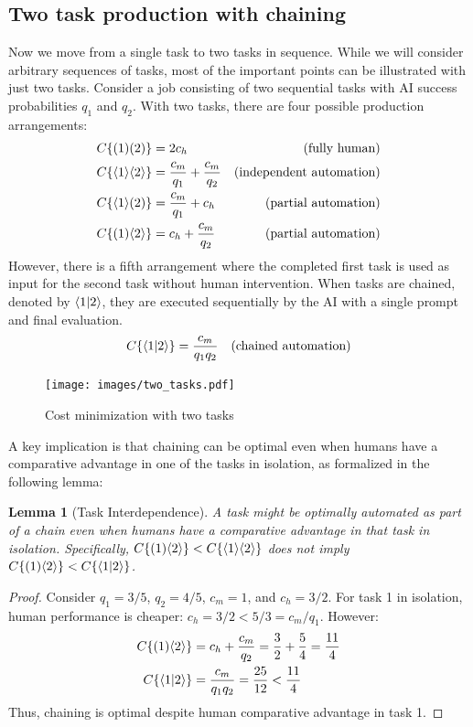 \documentclass{article}
\newtheorem{lemma}[theorem]{Lemma}
\begin{document}
\subsection{Two task production with chaining}
Now we move from a single task to two tasks in sequence. 
While we will consider arbitrary sequences of tasks, most of the important points can be illustrated with just two tasks.
Consider a job consisting of two sequential tasks with AI success probabilities $q_1$ and $q_2$.
With two tasks, there are four possible production arrangements:
\begin{align*}
    C\{ ( 1 )( 2 ) \} &= 2c_h & \text{(fully human)} \\
    C\{ \langle 1 \rangle\langle 2 \rangle \} &= \frac{c_m}{q_1} + \frac{c_m}{q_2} & \text{(independent automation)} \\
    C\{ \langle 1 \rangle( 2 ) \} &= \frac{c_m}{q_1} + c_h & \text{(partial automation)} \\
    C\{ ( 1 )\langle 2 \rangle \} &= c_h + \frac{c_m}{q_2} & \text{(partial automation)} \\
\end{align*}
However, there is a fifth arrangement where the completed first task is used as input for the second task without human intervention.
When tasks are chained, denoted by $\langle 1|2 \rangle$, they are executed sequentially by the AI with a single prompt and final evaluation.
\begin{align}
C\{ \langle 1|2 \rangle \} &= \frac{c_m}{q_1q_2} & \text{(chained automation)}
\end{align}

\begin{figure}
  \caption{Cost minimization with two tasks} \label{fig:two_tasks}
  \texttt{[image: images/two\_tasks.pdf]}
\end{figure}

A key implication is that chaining can be optimal even when humans have a comparative advantage in one of the tasks in isolation, as formalized in the following lemma:

\begin{lemma}[Task Interdependence] \label{lemma:interdependence}
A task might be optimally automated as part of a chain even when humans have a comparative advantage in that task in isolation.
Specifically, $C\{ ( 1 )\langle 2 \rangle \} < C\{ \langle 1 \rangle\langle 2 \rangle \}$ does not imply $C\{ ( 1 )\langle 2 \rangle \} < C\{ \langle 1|2 \rangle \}$.
\end{lemma}

\begin{proof}
Consider $q_1 = 3/5$, $q_2 = 4/5$, $c_m = 1$, and $c_h = 3/2$.
For task 1 in isolation, human performance is cheaper: $c_h = 3/2 < 5/3 = c_m/q_1$.
However:
\begin{align*}
    C\{ ( 1 )\langle 2 \rangle \} &= c_h + \frac{c_m}{q_2} = \frac{3}{2} + \frac{5}{4} = \frac{11}{4} \\
    C\{ \langle 1|2 \rangle \} &= \frac{c_m}{q_1q_2} = \frac{25}{12} < \frac{11}{4}
\end{align*}
Thus, chaining is optimal despite human comparative advantage in task 1.
\end{proof}
\end{document}
